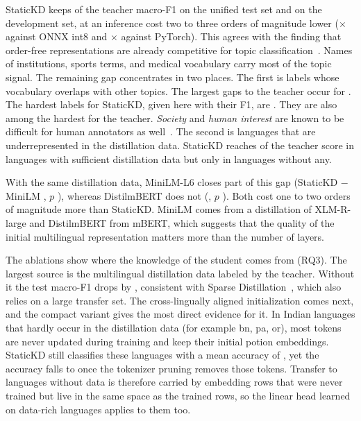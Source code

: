 StaticKD keeps  of the teacher macro-F1 on the unified test set and  on the development set, at an inference cost two to three orders of magnitude lower ($\times$ against ONNX int8 and $\times$ against PyTorch). This agrees with the finding that order-free representations are already competitive for topic classification~\cite{galke2022bow}. Names of institutions, sports terms, and medical vocabulary carry most of the topic signal. The remaining gap concentrates in two places. The first is labels whose vocabulary overlaps with other topics. The largest gaps to the teacher occur for . The hardest labels for StaticKD, given here with their F1, are . They are also among the hardest for the teacher. \emph{Society} and \emph{human interest} are known to be difficult for human annotators as well~\cite{kuzman2025llm}. The second is languages that are underrepresented in the distillation data. StaticKD reaches  of the teacher score in languages with sufficient distillation data but only  in languages without any.

With the same distillation data, MiniLM-L6 closes part of this gap (StaticKD $-$ MiniLM , $p$ ), whereas DistilmBERT does not (, $p$ ). Both cost one to two orders of magnitude more than StaticKD. MiniLM comes from a distillation of XLM-R-large and DistilmBERT from mBERT, which suggests that the quality of the initial multilingual representation matters more than the number of layers.

The ablations show where the knowledge of the student comes from (RQ3). The largest source is the multilingual distillation data labeled by the teacher. Without it the test macro-F1 drops by , consistent with Sparse Distillation~\cite{ye2022sparse}, which also relies on a large transfer set. The cross-lingually aligned initialization comes next, and the compact variant gives the most direct evidence for it. In Indian languages that hardly occur in the distillation data (for example bn, pa, or), most tokens are never updated during training and keep their initial potion embeddings. StaticKD still classifies these languages with a mean accuracy of , yet the accuracy falls to  once the tokenizer pruning removes those tokens. Transfer to languages without data is therefore carried by embedding rows that were never trained but live in the same space as the trained rows, so the linear head learned on data-rich languages applies to them too.

